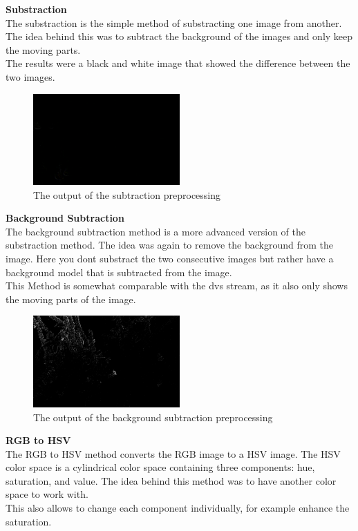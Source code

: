 \textbf{Substraction} \\
The substraction is the simple method of substracting one image from another. The idea behind this was to subtract the background of the images and only keep the moving parts.\\
The results were a black and white image that showed the difference between the two images.\\

\begin{figure}[htbp]
    \centering
    \includegraphics[width=0.5\textwidth]{../images/img_002_002309_Sub.png}
    \caption{The output of the subtraction preprocessing}
\end{figure}

\textbf{Background Subtraction} \\
The background subtraction method is a more advanced version of the substraction method. The idea was again to remove the background from the image. Here you dont substract the two consecutive images but rather have a background model that is subtracted from the image.\\
This Method is somewhat comparable with the dvs stream, as it also only shows the moving parts of the image.\\

\begin{figure}[htbp]
    \centering
    \includegraphics[width=0.5\textwidth]{../images/img_002_002309_BackSub.png}
    \caption{The output of the background subtraction preprocessing}
\end{figure}


\textbf{RGB to HSV} \\
The RGB to HSV method converts the RGB image to a HSV image. The HSV color space is a cylindrical color space containing three components: hue, saturation, and value. The idea behind this method was to have another color space to work with.\\
This also allows to change each component individually, for example enhance the saturation.\\

